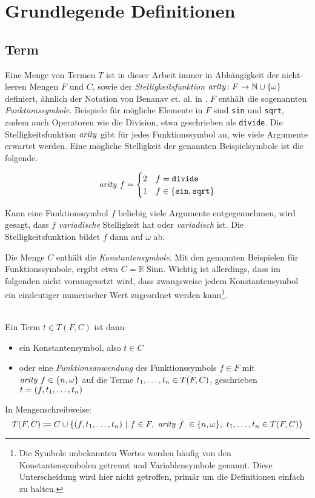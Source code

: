 


\chapter{Grundlegende Definitionen} \label{secGrundlegendeDefinitionen}

\section{Term} \label{subsecTerm}
Eine Menge von Termen $T$ ist in dieser Arbeit immer  in Abhängigkeit der nicht-leeren Mengen $F$ und $C$, sowie der \emph{Stelligkeitsfunktion} $\Const{arity} \colon F \rightarrow \mathbb{N} \cup \{\omega\}$ definiert, ähnlich der Notation von Benanav et. al. in \cite{NPHardMatching}. $F$ enthält die sogenannten \emph{Funktionssymbole}. Beispiele für mögliche Elemente in $F$ sind \texttt{sin} und \texttt{sqrt}, zudem auch Operatoren wie die Division, etwa geschrieben als \texttt{divide}. Die Stelligkeitsfunktion $\Const{arity}$ gibt für jedes Funktionssymbol an, wie viele Argumente erwartet werden. Eine mögliche Stelligkeit der genannten Beispielsymbole ist die folgende.

$$\Const{arity}~f = \begin{cases}
2 & f  = \texttt{divide}\\
1 & f \in \{\texttt{sin}, \texttt{sqrt}\}\\
\end{cases}$$

Kann eine Funktionssymbol $f$ beliebig viele Argumente entgegennehmen, wird gesagt, dass $f$ \emph{variadische} Stelligkeit hat oder \emph{variadisch} ist. Die Stelligkeitsfunktion bildet $f$ dann auf $\omega$ ab. 

Die Menge $C$ enthält die \emph{Konstantensymbole}. Mit den genannten Beispielen für Funktionssymbole, ergibt etwa $C = \mathbb R$ Sinn. Wichtig ist allerdings, dass im folgenden nicht vorausgesetzt wird, dass zwangsweise jedem Konstantensymbol ein eindeutiger numerischer Wert zugeordnet werden kann\footnote{Die Symbole unbekannten Wertes werden häufig von den Konstantensymbolen getrennt und Variablensymbole genannt. Diese Unterscheidung wird hier nicht getroffen, primär um die Definitionen einfach zu halten.}.




\begin{definition}\label{defTerm}~\\
Ein \Gls{Term} $t \in T(F, C)$ ist dann  {
\begin{itemize}
	\item{ein \Gls{Konstantensymbol}, also $t \in C$}
	\item{oder eine \emph{\Gls{Funktionsanwendung}} des Funktionssymbols $f \in F$ mit $\Const{arity}~f \in \{n, \omega\}$ 
		auf die Terme ${\tOneN \in T(F, C)}$, geschrieben ${t = (f, \tOneN)}$}
\end{itemize}}
In Mengenschreibweise:
$$T(F, C) \coloneqq C \cup \curl*{
(f, \tOneN)~|
~f\in F,~\Const{arity}~f~ \in \{n, \omega\},~ \tOneN \in T(F, C)
}$$ 
\end{definition}

